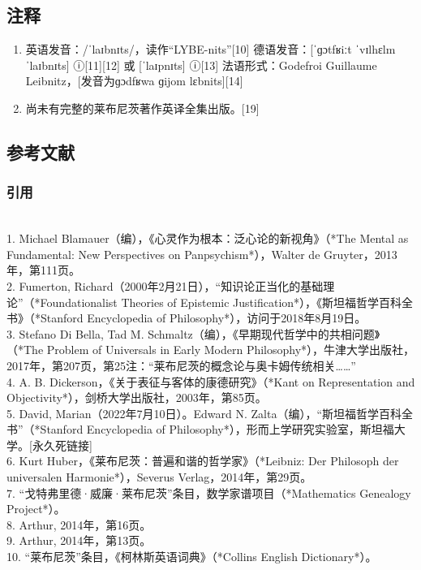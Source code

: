 \subsection{注释}  
\begin{enumerate}
\item 英语发音：/ˈlaɪbnɪts/，读作“LYBE-nits”[10]  德语发音：[ˈɡɔtfʁiːt ˈvɪlhɛlm ˈlaɪbnɪts] ⓘ[11][12] 或 [ˈlaɪpnɪts] ⓘ[13] 法语形式：Godefroi Guillaume Leibnitz，[发音为ɡɔdfʁwa ɡijom lɛbnits][14]  
\item 尚未有完整的莱布尼茨著作英译全集出版。[19]  
\end{enumerate}
\subsection{参考文献 }
\subsubsection{引用} \\ 
1. Michael Blamauer（编），《心灵作为根本：泛心论的新视角》（*The Mental as Fundamental: New Perspectives on Panpsychism*），Walter de Gruyter，2013年，第111页。\\  
2. Fumerton, Richard（2000年2月21日），“知识论正当化的基础理论”（*Foundationalist Theories of Epistemic Justification*），《斯坦福哲学百科全书》（*Stanford Encyclopedia of Philosophy*），访问于2018年8月19日。\\ 
3. Stefano Di Bella, Tad M. Schmaltz（编），《早期现代哲学中的共相问题》（*The Problem of Universals in Early Modern Philosophy*），牛津大学出版社，2017年，第207页，第25注：“莱布尼茨的概念论与奥卡姆传统相关……” \\
4. A. B. Dickerson，《关于表征与客体的康德研究》（*Kant on Representation and Objectivity*），剑桥大学出版社，2003年，第85页。\\ 
5. David, Marian（2022年7月10日）。Edward N. Zalta（编），“斯坦福哲学百科全书”（*Stanford Encyclopedia of Philosophy*），形而上学研究实验室，斯坦福大学。[永久死链接] \\
6. Kurt Huber，《莱布尼茨：普遍和谐的哲学家》（*Leibniz: Der Philosoph der universalen Harmonie*），Severus Verlag，2014年，第29页。\\
7. “戈特弗里德·威廉·莱布尼茨”条目，数学家谱项目（*Mathematics Genealogy Project*）。\\  
8. Arthur, 2014年，第16页。\\  
9. Arthur, 2014年，第13页。 \\ 
10. “莱布尼茨”条目，《柯林斯英语词典》（*Collins English Dictionary*）。\\  

